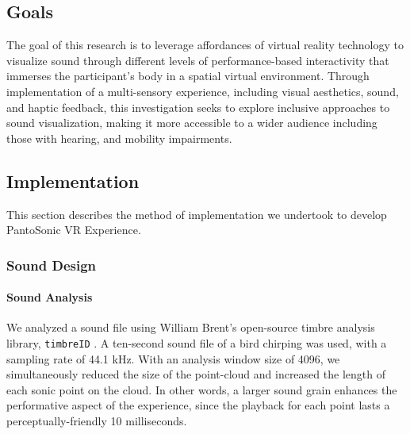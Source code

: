 \documentclass{nime-alternate}
\begin{document}
\subsection{Goals}
The goal of this research is to leverage affordances of virtual reality technology to visualize sound through different levels of performance-based interactivity that immerses the participant's body in a spatial virtual environment. Through implementation of a multi-sensory experience, including visual aesthetics, sound, and haptic feedback, this investigation seeks to explore inclusive approaches to sound visualization, making it more accessible to a wider audience including those with hearing, and mobility impairments.


\subsection{Implementation}

This section describes the method of implementation we undertook to develop PantoSonic VR Experience.

\subsubsection{Sound Design}



\paragraph{Sound Analysis} We analyzed a sound file using William Brent's open-source timbre analysis library, \texttt{timbreID} \cite{icmc/bbp2372.2010.044}. A ten-second sound file of a bird chirping was used, with a sampling rate of 44.1 kHz. With an analysis window size of 4096, we simultaneously reduced the size of the point-cloud and increased the length of each sonic point on the cloud. In other words, a larger sound grain enhances the performative aspect of the experience, since the playback for each point lasts a perceptually-friendly 10 milliseconds.
\end{document}
